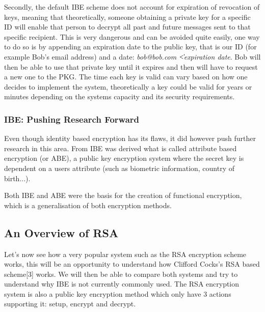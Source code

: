 \documentclass[conference]{IEEEtran}
\begin{document}
Secondly, the default IBE scheme does not account for expiration of revocation of keys,
meaning that theoretically, someone obtaining a private key for a specific ID will enable 
that person to decrypt all past and future messages sent to that specific recipient.
This is very dangerous and can be avoided quite easily, one way to do so is by appending an 
expiration date to the public key, that is our ID (for example Bob's email address) and a date:
\textit{bob@bob.com \|\| <expiration date}. Bob will then be able to use that private key until 
it expires and then will have to request a new one to the PKG. The time each key is valid can 
vary based on how one decides to implement the system, theoretically a key could 
be valid for years or minutes depending on the systems capacity and its security requirements.

\subsubsection{IBE: Pushing Research Forward}
Even though identity based encryption has its flaws, it did however 
push further research in this area. From IBE was derived what is called
attribute based encryption (or ABE), a public key encryption system where the secret key is dependent 
on a users attribute (such as biometric information, country of birth...).

Both IBE and ABE were the basis for the creation of functional encryption, 
which is a generalisation of both encryption methods.


\subsection{An Overview of RSA}
Let's now see how a very popular system such as the RSA encryption scheme works, 
this will be an opportunity to understand how Clifford Cocks's RSA based scheme[3] works.
We will then be able to compare both systems and try to understand why 
IBE is not currently commonly used.
The RSA encryption system is also a public key encryption method 
which only have 3 actions supporting it: setup, encrypt and decrypt.
\end{document}
